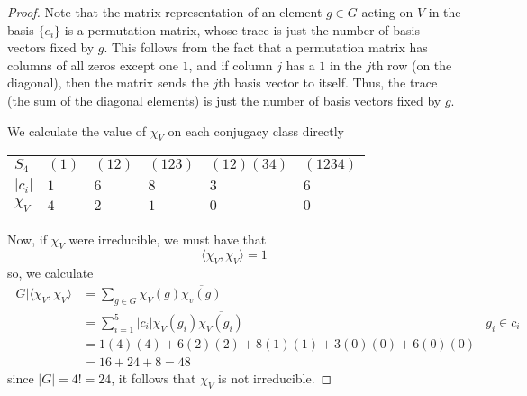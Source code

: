 \documentclass[12pt,reqno]{amsart}
\begin{document}
\begin{proof}
    Note that the matrix representation of an element $g\in G$ acting on $V$ in
    the basis $\{e_i\}$ is a permutation matrix, whose trace is just the number
    of basis vectors fixed by $g$. This follows from the fact that a permutation
    matrix has columns of all zeros except one $1$, and if column $j$ has a $1$
    in the $j$th row (on the diagonal), then the matrix sends the $j$th basis
    vector to itself. Thus, the trace (the sum of the diagonal elements) is just
    the number of basis vectors fixed by $g$.

    We calculate the value of $\chi_V$ on each conjugacy class directly
    \begin{center}
        \begin{tabular}{l| l l l l l}
            $S_4$    & $(1)$ & $(12)$ & $(123)$ & $(12)(34)$ & $(1234)$\\
            $|c_i|$  & $1$   & $6$    & $8$     & $3$        & $6$\\
            \hline
            $\chi_V$ & $4$   & $2$    & $1$     & $0$        & $0$\\
        \end{tabular}
    \end{center}
    Now, if $\chi_V$ were irreducible, we must have that
    \[
        \langle \chi_V,\chi_V\rangle = 1
    \]
    so, we calculate
    \[
        \begin{aligned}
            |G|\langle \chi_V,\chi_V\rangle &= \sum_{g\in
            G}\chi_V(g)\overline{\chi_v(g)}\\
            &= \sum_{i=1}^5|c_i|\chi_V(g_i)\overline{\chi_V(g_i)} &g_i\in c_i\\
            &= 1(4)(4) + 6(2)(2) + 8(1)(1) + 3(0)(0) + 6(0)(0)\\
            &= 16 + 24 + 8 = 48
        \end{aligned}
    \]
    since $|G| = 4! = 24$, it follows that $\chi_V$ is not irreducible.
\end{proof}
\end{document}
